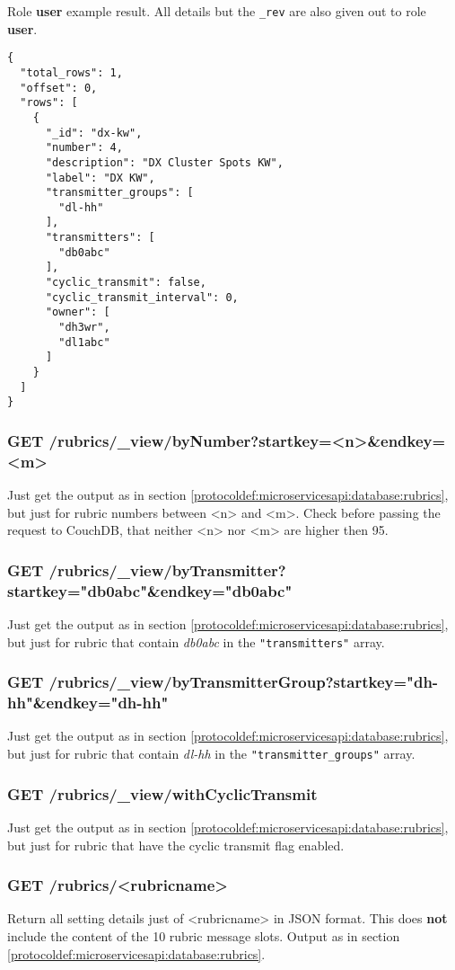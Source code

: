 Role \textbf{user} example result. All details but the \verb|_rev| are also given out to role \textbf{user}.
\begin{lstlisting}
{
  "total_rows": 1,
  "offset": 0,
  "rows": [
    {
      "_id": "dx-kw",
      "number": 4,
      "description": "DX Cluster Spots KW",
      "label": "DX KW",
      "transmitter_groups": [
        "dl-hh"
      ],
      "transmitters": [
        "db0abc"
      ],
      "cyclic_transmit": false,
      "cyclic_transmit_interval": 0,
      "owner": [
        "dh3wr",
        "dl1abc"
      ]
    }
  ]
}
\end{lstlisting}

\subsubsection{GET /rubrics/\_view/byNumber?startkey=<n>\&endkey=<m>}
Just get the output as in section \ref{protocoldef:microservicesapi:database:rubrics}, but just for rubric numbers between <n> and <m>. Check before passing the request to CouchDB, that neither <n> nor <m> are higher then 95.

\subsubsection{GET /rubrics/\_view/byTransmitter?startkey="db0abc"\&endkey="db0abc"}
Just get the output as in section \ref{protocoldef:microservicesapi:database:rubrics}, but just for rubric that contain \textit{db0abc} in the \verb|"transmitters"| array.

\subsubsection{GET /rubrics/\_view/byTransmitterGroup?startkey="dh-hh"\&endkey="dh-hh"}
Just get the output as in section \ref{protocoldef:microservicesapi:database:rubrics}, but just for rubric that contain \textit{dl-hh} in the \verb|"transmitter_groups"| array.

\subsubsection{GET /rubrics/\_view/withCyclicTransmit}
Just get the output as in section \ref{protocoldef:microservicesapi:database:rubrics}, but just for rubric that have the cyclic transmit flag enabled.

\subsubsection{GET /rubrics/<rubricname>}
\label{protocoldef:microservicesapi:database:getrubricname}
Return all setting details just of <rubricname> in JSON format. This does \textbf{not} include the content of the 10 rubric message slots. Output as in section \ref{protocoldef:microservicesapi:database:rubrics}.

